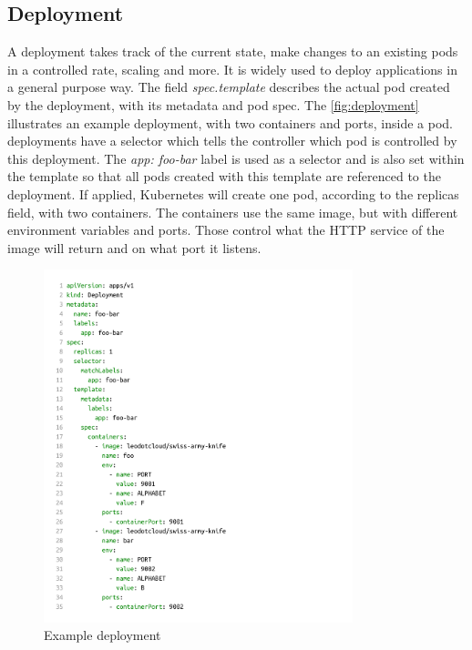 \subsection{Deployment}\label{subsec:deployment}

A deployment takes track of the current state, make changes to an existing pods in a controlled rate, scaling and more.
It is widely used to deploy applications in a general purpose way.
The field \textit{spec.template} describes the actual pod created by the deployment, with its metadata and pod spec.
The \autoref{fig:deployment} illustrates an example deployment, with two containers and ports, inside a pod.
deployments have a selector which tells the controller which pod is controlled by this deployment.
The \textit{app: foo-bar} label is used as a selector and is also set within the template so that all pods created with this template are referenced to the deployment.
If applied, Kubernetes will create one pod, according to the replicas field, with two containers.
The containers use the same image, but with different environment variables and ports.
Those control what the HTTP service of the image will return and on what port it listens.~\cite{KUBERNETES-DEPLOYMENT}

\begin{figure}[H]
    \centering
    \includegraphics[width=0.8\textwidth, left]{media/02/deployment}
    \caption{Example deployment}
    \label{fig:deployment}
\end{figure}


